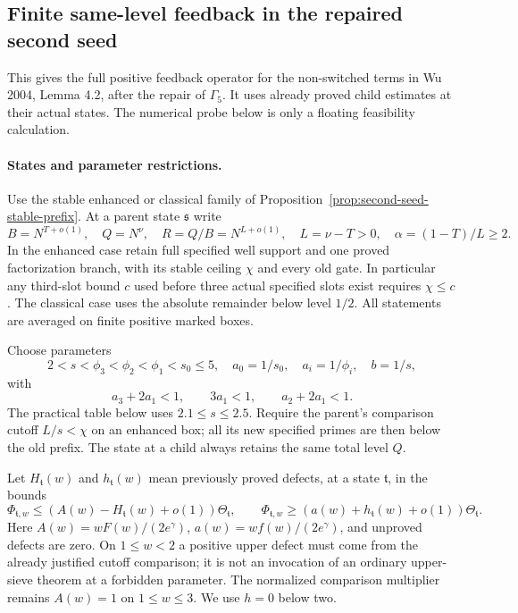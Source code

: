 \subsection{Finite same-level feedback in the repaired second seed}
\label{sec:second-seed-finite-feedback}

This gives the full positive feedback operator for the non-switched
terms in Wu 2004, Lemma 4.2, after the repair of $\Gamma_5$.
It uses already proved child estimates at their actual states.
The numerical probe below is only a floating feasibility calculation.

\paragraph{States and parameter restrictions.}
Use the stable enhanced or classical family of
Proposition~\ref{prop:second-seed-stable-prefix}.  At a parent state
$\mathfrak s$ write
\[
 B=N^{T+o(1)},\quad Q=N^\nu,\quad R=Q/B=N^{L+o(1)},\quad
 L=\nu-T>0,\quad \alpha=(1-T)/L\ge2.
\]
In the enhanced case retain full specified well support and one
proved factorization branch, with its stable ceiling $\chi$ and
every old gate.  In particular any third-slot bound $c$ used before
three actual specified slots exist requires $\chi\le c$.
The classical case uses the absolute remainder below level $1/2$.
All statements are averaged on finite positive marked boxes.

Choose parameters
\[
 2<s<\phi_3<\phi_2<\phi_1<s_0\le5,
 \quad a_0=1/s_0,\quad a_i=1/\phi_i,\quad b=1/s,
\]
with
\begin{equation}\label{eq:feedback-parameter-gates}
 a_3+2a_1<1,\qquad 3a_1<1,\qquad a_2+2a_1<1.
\end{equation}
The practical table below uses $2.1\le s\le2.5$.
Require the parent's comparison cutoff $L/s<\chi$ on an enhanced
box; all its new specified primes are then below the old prefix.
The state at a child always retains the same total level $Q$.

Let $H_{\mathfrak t}(w)$ and $h_{\mathfrak t}(w)$ mean previously
proved defects, at a state $\mathfrak t$, in the bounds
\[
 \Phi_{\mathfrak t,w}\le
 (A(w)-H_{\mathfrak t}(w)+o(1))\Theta_{\mathfrak t},\qquad
 \Phi_{\mathfrak t,w}\ge
 (a(w)+h_{\mathfrak t}(w)+o(1))\Theta_{\mathfrak t}.
\]
Here $A(w)=wF(w)/(2e^\gamma)$, $a(w)=wf(w)/(2e^\gamma)$,
and unproved defects are zero.  On $1\le w<2$ a positive upper
defect must come from the already justified cutoff comparison;
it is not an invocation of an ordinary upper-sieve theorem at a
forbidden parameter.  The normalized comparison multiplier remains
$A(w)=1$ on $1\le w\le3$.  We use $h=0$ below two.

